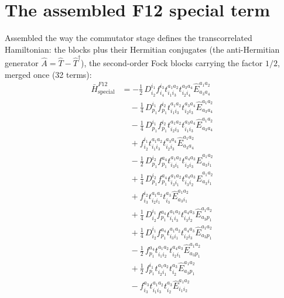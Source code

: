 \documentclass[11pt]{article}
\begin{document}
\section{The assembled F12 special term}
Assembled the way the commutator stage defines the transcorrelated Hamiltonian: the blocks plus their Hermitian conjugates (the anti-Hermitian generator $\hat A = \hat T - \hat T^\dagger$), the second-order Fock blocks carrying the factor $1/2$, merged once (32 terms):
\begin{align}
\bar H^{F12}_{\mathrm{special}} &= - \tfrac{1}{2}\, D^{i_{1}}_{i_{2}} f^{i_{3}}_{i_{4}} t^{a_{1}a_{2}}_{i_{1}i_{3}} t^{a_{3}a_{4}}_{i_{2}i_{4}} \hat{E}^{a_{1}a_{2}}_{a_{3}a_{4}} \\
&\quad - \tfrac{1}{4}\, D^{i_{1}}_{p_{1}} f^{i_{2}}_{p_{1}} t^{a_{1}a_{2}}_{i_{1}i_{3}} t^{a_{3}a_{4}}_{i_{2}i_{3}} \hat{E}^{a_{1}a_{2}}_{a_{3}a_{4}} \\
&\quad - \tfrac{1}{4}\, D^{i_{1}}_{p_{1}} f^{i_{2}}_{p_{1}} t^{a_{1}a_{2}}_{i_{2}i_{3}} t^{a_{3}a_{4}}_{i_{1}i_{3}} \hat{E}^{a_{1}a_{2}}_{a_{3}a_{4}} \\
&\quad + f^{i_{1}}_{i_{2}} t^{a_{1}a_{2}}_{i_{1}i_{3}} t^{a_{3}a_{4}}_{i_{2}i_{3}} \hat{E}^{a_{1}a_{2}}_{a_{3}a_{4}} \\
&\quad - \tfrac{1}{2}\, D^{i_{2}}_{p_{1}} f^{a_{4}}_{p_{1}} t^{a_{1}a_{2}}_{i_{3}i_{1}} t^{a_{4}a_{3}}_{i_{2}i_{3}} \hat{E}^{a_{1}a_{2}}_{a_{3}i_{1}} \\
&\quad + \tfrac{1}{4}\, D^{i_{2}}_{p_{1}} f^{a_{4}}_{p_{1}} t^{a_{1}a_{2}}_{i_{3}i_{1}} t^{a_{4}a_{3}}_{i_{3}i_{2}} \hat{E}^{a_{1}a_{2}}_{a_{3}i_{1}} \\
&\quad + f^{i_{2}}_{i_{3}} t^{a_{1}a_{2}}_{i_{2}i_{1}} t^{a_{3}}_{i_{3}} \hat{E}^{a_{1}a_{2}}_{a_{3}i_{1}} \\
&\quad + \tfrac{1}{4}\, D^{i_{1}}_{i_{2}} f^{a_{4}}_{p_{1}} t^{a_{1}a_{2}}_{i_{1}i_{3}} t^{a_{4}a_{3}}_{i_{3}i_{2}} \hat{E}^{a_{1}a_{2}}_{a_{3}p_{1}} \\
&\quad + \tfrac{1}{4}\, D^{i_{1}}_{i_{2}} f^{a_{4}}_{p_{1}} t^{a_{1}a_{2}}_{i_{3}i_{1}} t^{a_{4}a_{3}}_{i_{2}i_{3}} \hat{E}^{a_{1}a_{2}}_{a_{3}p_{1}} \\
&\quad - \tfrac{1}{2}\, f^{a_{4}}_{p_{1}} t^{a_{1}a_{2}}_{i_{1}i_{2}} t^{a_{4}a_{3}}_{i_{2}i_{1}} \hat{E}^{a_{1}a_{2}}_{a_{3}p_{1}} \\
&\quad + \tfrac{1}{2}\, f^{i_{1}}_{p_{1}} t^{a_{1}a_{2}}_{i_{2}i_{1}} t^{a_{3}}_{i_{2}} \hat{E}^{a_{1}a_{2}}_{a_{3}p_{1}} \\
&\quad - f^{a_{3}}_{i_{3}} t^{a_{1}a_{2}}_{i_{1}i_{3}} t^{a_{3}}_{i_{2}} \hat{E}^{a_{1}a_{2}}_{i_{1}i_{2}} \\

\end{align}
\end{document}
